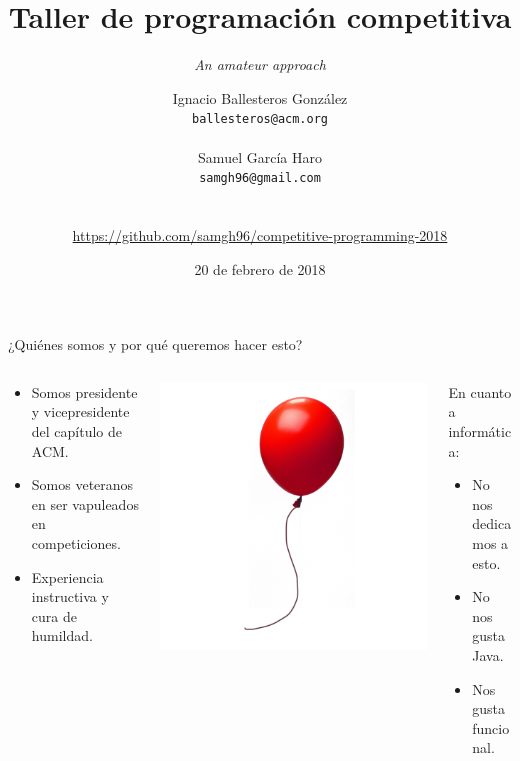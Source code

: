 \documentclass[10pt]{beamer}
\title{Taller de programación competitiva}
\subtitle{\textit{An amateur approach}}
\date{20 de febrero de 2018}
\author{
  Ignacio Ballesteros González\\
  {\color{mygray}\texttt{ballesteros@acm.org}\\}
  \\
  Samuel García Haro\\
  {\color{mygray}\texttt{samgh96@gmail.com}\\
    \\
  \\\href{https://github.com/samgh96/competitive-programming-2018}{https://github.com/samgh96/competitive-programming-2018}}
}
\institute{}
\begin{document}
\maketitle

\begin{frame}{¿Quiénes somos y por qué queremos hacer esto?}
  \begin{columns}[onlytextwidth]
    \begin{column}{0.3\textwidth}
      \centering
      \begin{itemize}
      \item Somos presidente y vicepresidente del capítulo de ACM.
      \item Somos veteranos en ser vapuleados en competiciones.
      \item Experiencia instructiva y cura de humildad.
      \end{itemize}
    \end{column}
    \begin{column}{0.3\textwidth}
      \centering
      \includegraphics[width=\textwidth]{globo.png}
    \end{column}
    \begin{column}{0.35\textwidth}
      En cuanto a informática:
      \begin{itemize}
      \item No nos dedicamos a esto.
      \item No nos gusta Java.
      \item Nos gusta funcional.
      \end{itemize}
    \end{column}
  \end{columns}
\end{frame}
\end{document}
